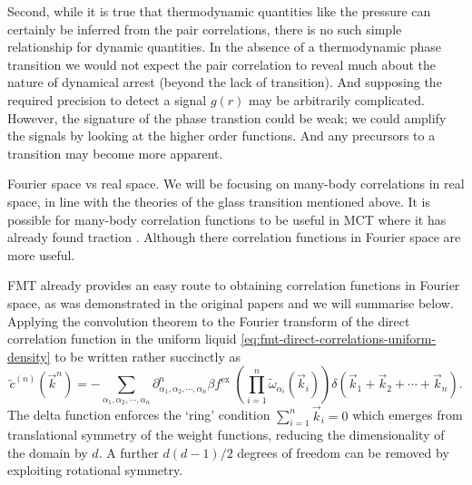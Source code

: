 Second, while it is true that thermodynamic quantities like the pressure can certainly be inferred from the pair correlations, there is no such simple relationship for dynamic quantities.
In the absence of a thermodynamic phase transition we would not expect the pair correlation to reveal much about the nature of dynamical arrest (beyond the lack of transition).
And supposing the required precision to detect a signal $g(r)$ may be arbitrarily complicated.
However, the signature of the phase transtion could be weak; we could amplify the signals by looking at the higher order functions.
And any precursors to a transition may become more apparent.

Fourier space vs real space.
We will be focusing on many-body correlations in real space, in line with the theories of the glass transition mentioned above.
It is possible for many-body correlation functions to be useful in MCT where it has already found traction \cite{JanssenPRL2015,JanssenFP2018}.
Although there correlation functions in Fourier space are more useful.

FMT already provides an easy route to obtaining correlation functions in Fourier space, as was demonstrated in the original papers \cite{RosenfeldPRL1989,RosenfeldJCP1990} and we will summarise below.
Applying the convolution theorem to the Fourier transform of the direct correlation function in the uniform liquid \eqref{eq:fmt-direct-correlations-uniform-density} to be written rather succinctly as
\begin{equation}
  \tilde{c}^{(n)}(\vec{k}^n)
  =
  - \sum_{\alpha_1, \alpha_2, \cdots, \alpha_n}
  \partial^n_{\alpha_1, \alpha_2, \cdots, \alpha_n} \beta f^\mathrm{ex} \;
  \left( \prod_{i=1}^n \widetilde{\omega}_{\alpha_i}(\vec{k}_i) \right)
  \delta(\vec{k}_1 + \vec{k}_2 + \cdots + \vec{k}_n).
\end{equation}
The delta function enforces the `ring' condition $\sum_{i=1}^n \vec{k}_i = 0$ which emerges from translational symmetry of the weight functions, reducing the dimensionality of the domain by $d$.
A further $d(d-1)/2$ degrees of freedom%
can be removed by exploiting rotational symmetry.
